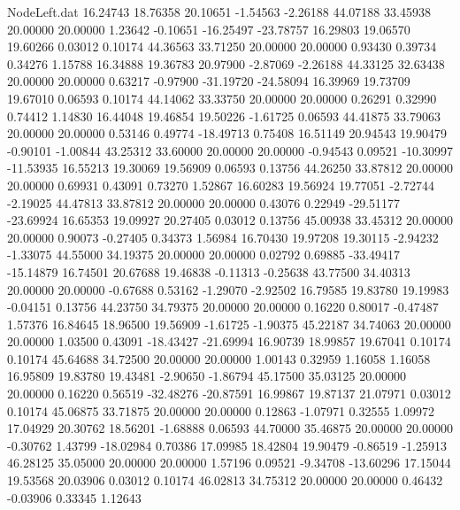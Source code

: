 \begin{filecontents}{NodeLeft.dat}
  16.24743   18.76358   20.10651    -1.54563   -2.26188   44.07188   33.45938   20.00000   20.00000    1.23642   -0.10651  -16.25497  -23.78757
  16.29803   19.06570   19.60266     0.03012    0.10174   44.36563   33.71250   20.00000   20.00000    0.93430    0.39734    0.34276    1.15788
  16.34888   19.36783   20.97900    -2.87069   -2.26188   44.33125   32.63438   20.00000   20.00000    0.63217   -0.97900  -31.19720  -24.58094
  16.39969   19.73709   19.67010     0.06593    0.10174   44.14062   33.33750   20.00000   20.00000    0.26291    0.32990    0.74412    1.14830
  16.44048   19.46854   19.50226    -1.61725    0.06593   44.41875   33.79063   20.00000   20.00000    0.53146    0.49774  -18.49713    0.75408
  16.51149   20.94543   19.90479    -0.90101   -1.00844   43.25312   33.60000   20.00000   20.00000   -0.94543    0.09521  -10.30997  -11.53935
  16.55213   19.30069   19.56909     0.06593    0.13756   44.26250   33.87812   20.00000   20.00000    0.69931    0.43091    0.73270    1.52867
  16.60283   19.56924   19.77051    -2.72744   -2.19025   44.47813   33.87812   20.00000   20.00000    0.43076    0.22949  -29.51177  -23.69924
  16.65353   19.09927   20.27405     0.03012    0.13756   45.00938   33.45312   20.00000   20.00000    0.90073   -0.27405    0.34373    1.56984
  16.70430   19.97208   19.30115    -2.94232   -1.33075   44.55000   34.19375   20.00000   20.00000    0.02792    0.69885  -33.49417  -15.14879
  16.74501   20.67688   19.46838    -0.11313   -0.25638   43.77500   34.40313   20.00000   20.00000   -0.67688    0.53162   -1.29070   -2.92502
  16.79585   19.83780   19.19983    -0.04151    0.13756   44.23750   34.79375   20.00000   20.00000    0.16220    0.80017   -0.47487    1.57376
  16.84645   18.96500   19.56909    -1.61725   -1.90375   45.22187   34.74063   20.00000   20.00000    1.03500    0.43091  -18.43427  -21.69994
  16.90739   18.99857   19.67041     0.10174    0.10174   45.64688   34.72500   20.00000   20.00000    1.00143    0.32959    1.16058    1.16058
  16.95809   19.83780   19.43481    -2.90650   -1.86794   45.17500   35.03125   20.00000   20.00000    0.16220    0.56519  -32.48276  -20.87591
  16.99867   19.87137   21.07971     0.03012    0.10174   45.06875   33.71875   20.00000   20.00000    0.12863   -1.07971    0.32555    1.09972
  17.04929   20.30762   18.56201    -1.68888    0.06593   44.70000   35.46875   20.00000   20.00000   -0.30762    1.43799  -18.02984    0.70386
  17.09985   18.42804   19.90479    -0.86519   -1.25913   46.28125   35.05000   20.00000   20.00000    1.57196    0.09521   -9.34708  -13.60296
  17.15044   19.53568   20.03906     0.03012    0.10174   46.02813   34.75312   20.00000   20.00000    0.46432   -0.03906    0.33345    1.12643

\end{filecontents}
